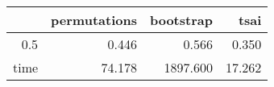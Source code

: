 \begin{table}[ht]
\centering
\begingroup\tiny
\begin{tabular}{rrrr}
  \hline
 & permutations & bootstrap & tsai \\ 
  \hline
0.5 & 0.446 & 0.566 & 0.350 \\ 
  time & 74.178 & 1897.600 & 17.262 \\ 
   \hline
\end{tabular}
\endgroup
\end{table}
